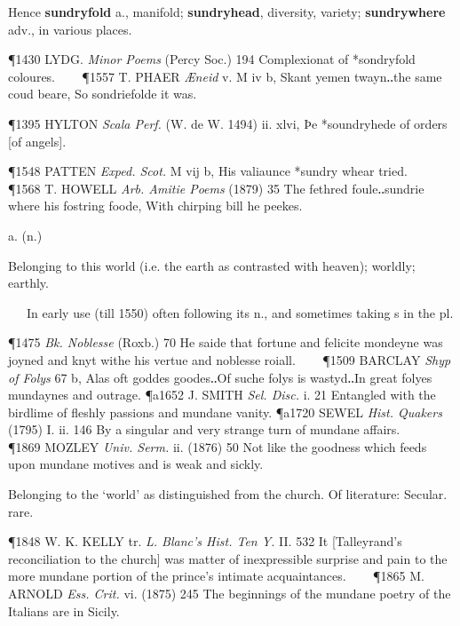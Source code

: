 \begin{description}[wide, labelwidth=!, labelindent=0pt]
\begin{myenumerate}
\noindent Hence \textbf{sundryfold} a., manifold; \textbf{sundryhead}, diversity, variety; 
\textbf{sundrywhere} adv., in various places.

\P 1430 LYDG.  \textit{Minor Poems} (Percy Soc.) 194 Complexionat of *sondryfold coloures.    
\P 1557 T. PHAER  \textit{Æneid} v. M iv b, Skant yemen twayn‥the same coud beare, So sondriefolde it was.

\P 1395 HYLTON  \textit{Scala Perf.} (W. de W. 1494) ii. xlvi, Þe *soundryhede of orders [of angels].

\P 1548 PATTEN  \textit{Exped. Scot.} M vij b, His valiaunce *sundry whear tried.    
\P 1568 T. HOWELL  \textit{Arb. Amitie Poems} (1879) 35 The fethred foule‥sundrie where his fostring foode, With chirping bill he peekes.
\end{myenumerate}

 a. (n.)

\noindent {}

\vspace{-0.3cm}

\begin{myenumerate}

 Belonging to this world (i.e. the earth as contrasted with heaven); worldly; earthly.

   In early use (till 1550) often following its n., and sometimes taking s in the pl.

\P 1475  \textit{Bk. Noblesse} (Roxb.) 70 He saide that fortune and felicite mondeyne was joyned and knyt withe his vertue and noblesse roiall.    
\P 1509 BARCLAY  \textit{Shyp of Folys} 67 b, Alas oft goddes goodes‥Of suche folys is wastyd‥In great folyes mundaynes and outrage.
\P a1652 J. SMITH  \textit{Sel. Disc.} i. 21 Entangled with the birdlime of fleshly passions and mundane vanity.
\P a1720 SEWEL  \textit{Hist. Quakers} (1795) I. ii. 146 By a singular and very strange turn of mundane affairs.    
\P 1869 MOZLEY  \textit{Univ. Serm.} ii. (1876) 50 Not like the goodness which feeds upon mundane motives and is weak and sickly.

 Belonging to the ‘world’ as distinguished from the church. Of literature: Secular. rare.

\P 1848 W. K. KELLY tr. \textit{L. Blanc's Hist. Ten Y.} II. 532 It [Talleyrand's reconciliation to the church] was matter of inexpressible surprise and pain to the more mundane portion of the prince's intimate acquaintances.    
\P 1865 M. ARNOLD  \textit{Ess. Crit.} vi. (1875) 245 The beginnings of the mundane poetry of the Italians are in Sicily.


\end{myenumerate}
\end{description}
